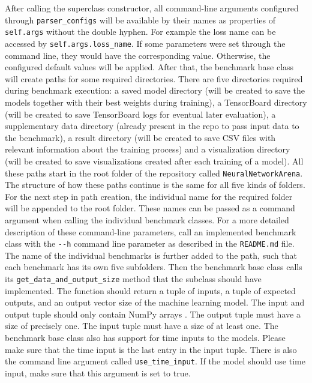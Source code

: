 \documentclass[draft,final]{vutinfth} %
\begin{document}
    After calling the superclass constructor, all command-line arguments configured through \texttt{parser\_configs} will be available by their names as properties of \texttt{self.args} without the double hyphen.
    For example the loss name can be accessed by \texttt{self.args.loss\_name}.
    If some parameters were set through the command line, they would have the corresponding value. Otherwise, the configured default values will be applied.
    After that, the benchmark base class will create paths for some required directories. 
    There are five directories required during benchmark execution: a saved model directory (will be created to save the models together with their best weights during training), a TensorBoard directory (will be created to save TensorBoard logs for eventual later evaluation), a supplementary data directory (already present in the repo to pass input data to the benchmark), a result directory (will be created to save CSV files with relevant information about the training process) and a visualization directory (will be created to save visualizations created after each training of a model).
    All these paths start in the root folder of the repository called \texttt{NeuralNetworkArena}. 
    The structure of how these paths continue is the same for all five kinds of folders.
    For the next step in path creation, the individual name for the required folder will be appended to the root folder.
    These names can be passed as a command argument when calling the individual benchmark classes. 
    For a more detailed description of these command-line parameters, call an implemented benchmark class with the \texttt{-{}-h} command line parameter as described in the \texttt{README.md} file.
    The name of the individual benchmarks is further added to the path, such that each benchmark has its own five subfolders.
    Then the benchmark base class calls its \texttt{get\_data\_and\_output\_size} method that the subclass should have implemented.
    The function should return a tuple of inputs, a tuple of expected outputs, and an output vector size of the machine learning model.
    The input and output tuple should only contain NumPy arrays \cite{numpy}. The output tuple must have a size of precisely one.
    The input tuple must have a size of at least one.
    The benchmark base class also has support for time inputs to the models.
    Please make sure that the time input is the last entry in the input tuple.
    There is also the command line argument called \texttt{use\_time\_input}. 
    If the model should use time input, make sure that this argument is set to true.
\end{document}
